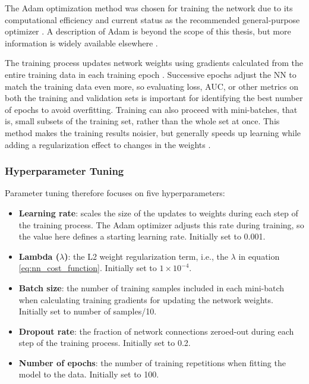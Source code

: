 The Adam optimization method was chosen for training the network due to its computational efficiency and current status as the recommended general-purpose optimizer \citep{brownlee_gentle_2017}. A description of Adam is beyond the scope of this thesis, but more information is widely available elsewhere \citep[e.g.,\ ][]{kingma_adam_2017}.

The training process updates network weights using gradients calculated from the entire training data in each training epoch \citep[p.\ 397]{hastie_elements_2009}. Successive epochs adjust the NN to match the training data even more, so evaluating loss, AUC, or other metrics on both the training and validation sets is important for identifying the best number of epochs to avoid overfitting. Training can also proceed with mini-batches, that is, small subsets of the training set, rather than the whole set at once. This method makes the training results noisier, but generally speeds up learning while adding a regularization effect to changes in the weights \citep{brownlee_how_2019}.  

\subsubsection{Hyperparameter Tuning}
\label{ch5:ann_tuning}

Parameter tuning therefore focuses on five hyperparameters:
\begin{itemize}[itemsep=2pt]
    \item \textbf{Learning rate}: scales the size of the updates to weights during each step of the training process. The Adam optimizer adjusts this rate during training, so the value here defines a starting learning rate. Initially set to 0.001.
    \item \textbf{Lambda ($\lambda$)}: the L2 weight regularization term, i.e., the $\lambda$ in equation \ref{eq:nn_cost_function}. Initially set to $1\times10^{-4}$.
    \item \textbf{Batch size}: the number of training samples included in each mini-batch when calculating training gradients for updating the network weights. Initially set to number of samples/10.
    \item \textbf{Dropout rate}: the fraction of network connections zeroed-out during each step of the training process. Initially set to 0.2.
    \item \textbf{Number of epochs}: the number of training repetitions when fitting the model to the data. Initially set to 100.
\end{itemize}

